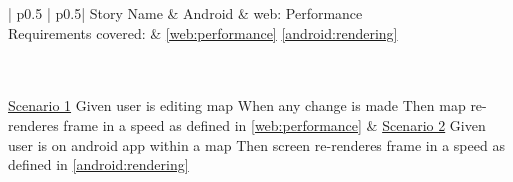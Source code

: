 \begin{longtable}{| p{} | p{}|}
	\hline
	\newline Story Name & \newline Android \& web: Performance\\\hline
	\newline Requirements covered: & \newline \ref{web:performance} \ref{android:rendering}\\\hline
	\\\hline
	\\\hline
	
	\newline\underline{Scenario 1}\newline
	Given user is editing map\newline
	When any change is made\newline 
	Then map re-renderes frame in a speed as defined in \ref{web:performance} \newline
	&
	\newline\underline{Scenario 2}\newline
	Given user is on android app within a map \newline
	Then screen re-renderes frame in a speed as defined in \ref{android:rendering} \newline
	
	\\\hline
\end{longtable}